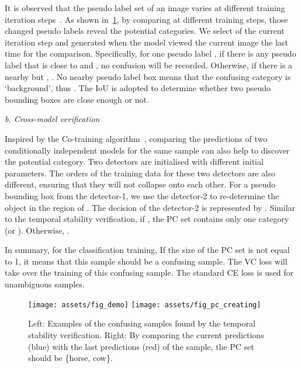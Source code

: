 \documentclass[runningheads]{llncs}
\begin{document}
\noindent It is observed that the pseudo label set  of an image varies at different training iteration steps~\cite{Qize_2021_Int}. As shown in~\cref{fig:pc-example}, by comparing  at different training steps, those changed pseudo labels reveal the potential categories. We select  of the current iteration step and  generated when the model viewed the current image the last time for the comparison.  Specifically, for one pseudo label , if there is any pseudo label  that is close to  and , no confusion will be recorded. Otherwise, if there is a nearby  but , . No nearby pseudo label box means that the confusing category is `background', thus . The IoU is adopted to determine whether two pseudo bounding boxes are close enough or not.

\vspace{0.5em}\noindent\textit{b. Cross-model verification}

\noindent Inspired by the Co-training algorithm~\cite{Avrim_1998_Com}, comparing the predictions of two conditionally independent models for the same sample can also help to discover the potential category. Two detectors are initialised with different initial parameters. The orders of the training data for these two detectors are also different, ensuring that they will not collapse onto each other. For a pseudo bounding box  from the detector-1, we use the detector-2 to re-determine the object in the region of . The decision of the detector-2 is represented by . Similar to the temporal stability verification, if , the PC set contains only one category  (or ). Otherwise, .

In summary, for the classification training, If the size of the PC set is not equal to 1, it means that this sample should be a confusing sample. The VC loss will take over the training of this confusing sample. The standard CE loss is used for unambiguous samples.

\begin{figure}[t]
  \centering
   \texttt{[image: assets/fig\_demo]}
   \hspace{1em}
   \texttt{[image: assets/fig\_pc\_creating]}
   \vspace{-0.5em}
   \caption{Left: Examples of the confusing samples found by the temporal stability verification. Right: By comparing the current predictions (blue) with the last predictions (red) of the sample, the PC set should be \{horse, cow\}.}
   \label{fig:pc-example}
\vspace{-2em}
\end{figure}
\end{document}

